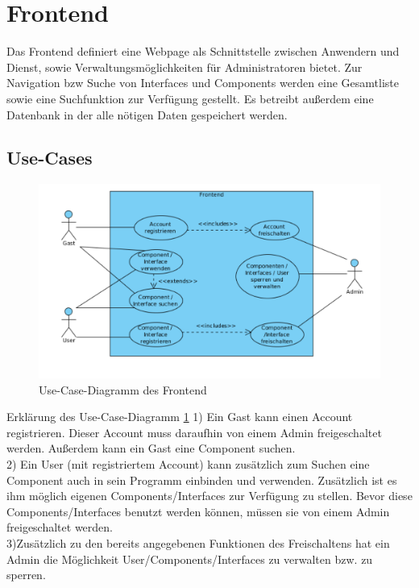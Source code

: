 \section{Frontend}
Das Frontend definiert eine Webpage als Schnittstelle zwischen Anwendern und Dienst, sowie Verwaltungsmöglichkeiten für Administratoren bietet. Zur Navigation bzw Suche von Interfaces und Components werden eine Gesamtliste sowie eine Suchfunktion zur Verfügung gestellt. Es betreibt außerdem eine Datenbank in der alle nötigen Daten gespeichert werden.

\subsection{Use-Cases}

\begin{figure}[!htp]
\begin{center}
\includegraphics[width=\textwidth]{bilder/use_case_frontend.pdf}
\caption{Use-Case-Diagramm des Frontend}
\label{fig:uc_front}
\end{center}
\end{figure}

Erklärung des Use-Case-Diagramm \ref{fig:uc_front}
1) Ein Gast kann einen Account registrieren. Dieser Account muss daraufhin von einem Admin freigeschaltet werden. Außerdem kann ein Gast eine Component suchen.\\
2) Ein User (mit registriertem Account) kann zusätzlich zum Suchen eine Component auch in sein Programm einbinden und verwenden. Zusätzlich ist es ihm möglich eigenen Components/Interfaces zur Verfügung zu stellen. Bevor diese Components/Interfaces benutzt werden können, müssen sie von einem Admin freigeschaltet werden.\\
3)Zusätzlich zu den bereits angegebenen Funktionen des Freischaltens hat ein Admin die Möglichkeit User/Components/Interfaces zu verwalten bzw. zu sperren.\\

